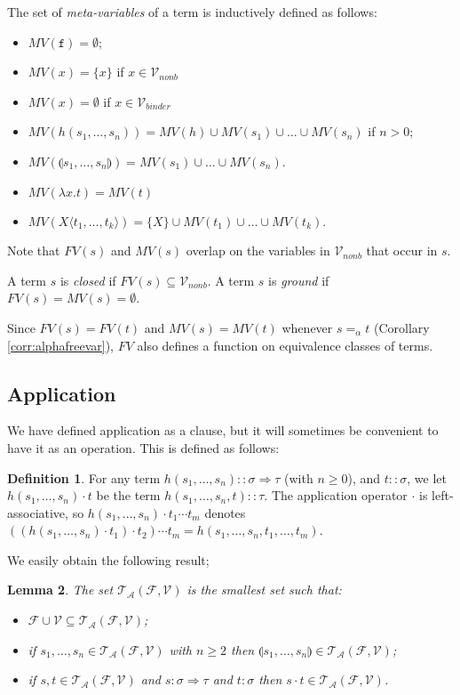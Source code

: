 \documentclass{lmcs}
\theoremstyle{theorem}\newtheorem{theorem}{Theorem}
\theoremstyle{theorem}\newtheorem{lemma}[theorem]{Lemma}
\theoremstyle{theorem}\newtheorem{corollary}[theorem]{Corollary}
\theoremstyle{definition}\newtheorem{definition}[theorem]{Definition}
\theoremstyle{definition}\newtheorem{example}[theorem]{Example}
\newcommand{\F}{\mathcal{F}}
\newcommand{\V}{\mathcal{V}}
\newcommand{\Vfree}{\mathcal{V}_{\mathit{nonb}}}
\newcommand{\Vbound}{\mathcal{V}_{\mathit{binder}}}
\newcommand{\ATerms}{\mathcal{T}_{\mathcal{A}}}
\newcommand{\FV}{\mathit{FV}}
\newcommand{\FMV}{\mathit{MV}}
\newcommand{\atype}{\sigma}
\newcommand{\btype}{\tau}
\newcommand{\identifier}[1]{\mathtt{#1}}
\newcommand{\afun}{\identifier{f}}
\newcommand{\avar}{x}
\newcommand{\Avar}{X}
\newcommand{\abs}[2]{\lambda #1.#2}
\newcommand{\meta}[2]{#1\langle#2\rangle}
\newcommand{\tuple}[2]{\llparenthesis #1,\dots,#2 \rrparenthesis}
\newcommand{\arrtype}{\Rightarrow}
\begin{document}
The set of \emph{meta-variables} of a term is inductively defined as follows:
\begin{itemize}
\item $\FMV(\afun) = \emptyset$;
\item $\FMV(\avar) = \{ \avar \}$ if $\avar \in \Vfree$
\item $\FMV(\avar) = \emptyset$ if $\avar \in \Vbound$
\item $\FMV(h(s_1,\dots,s_n)) = \FMV(h) \cup \FMV(s_1) \cup \dots \cup
  \FMV(s_n)$ if $n > 0$;
\item $\FMV(\tuple{s_1}{s_n}) = \FMV(s_1) \cup \dots \cup \FMV(s_n)$.
\item $\FMV(\abs{\avar}{t}) = \FMV(t)$
\item $\FMV(\meta{\Avar}{t_1,\dots,t_k}) = \{ \Avar \} \cup \FMV(t_1) \cup
  \dots \cup \FMV(t_k)$.
\end{itemize}

Note that $\FV(s)$ and $\FMV(s)$ overlap on the variables in $\Vfree$ that occur
in $s$.

A term $s$ is \emph{closed} if $\FV(s) \subseteq \Vfree$.
A term $s$ is \emph{ground} if $\FV(s) = \FMV(s) = \emptyset$.

Since $\FV(s) = \FV(t)$ and $\FMV(s) = \FMV(t)$ whenever $s =_\alpha t$
(Corollary \ref{corr:alphafreevar}), $\FV$ also defines a function on
equivalence classes of terms.

\subsection{Application}\label{subsec:application}
We have defined application as a clause, but it will sometimes be convenient to
have it as an operation.  This is defined as follows:

\begin{definition}
For any term $h(s_1,\dots,s_n) :: \atype \arrtype \btype$ (with $n \geq 0$),
and $t :: \atype$, we let $h(s_1,\dots,s_n) \cdot t$ be the term
$h(s_1,\dots,s_n,t) :: \btype$.
The application operator $\cdot$ is left-associative, so $h(s_1,\dots,s_n)
\cdot t_1 \cdots t_m$ denotes $((h(s_1,\dots,s_n) \cdot t_1) \cdot t_2) \cdots
t_m = h(s_1,\dots,s_n,t_1,\dots,t_m)$.
\end{definition}

We easily obtain the following result;

\begin{lemma}\label{lem:applicative_notation}
The set $\ATerms(\F,\V)$ is the smallest set such that:
\begin{itemize}
\item $\F \cup \V \subseteq \ATerms(\F,\V)$;
\item if $s_1,\dots,s_n \in \ATerms(\F,\V)$ with $n \geq 2$ then
  $\tuple{s_1}{s_n} \in \ATerms(\F,\V)$;
\item if $s,t \in \ATerms(\F,\V)$ and $s : \atype \arrtype \btype$ and $t : \atype$ then
  $s \cdot t \in \ATerms(\F,\V)$.
\end{itemize}
\end{lemma}
\end{document}

